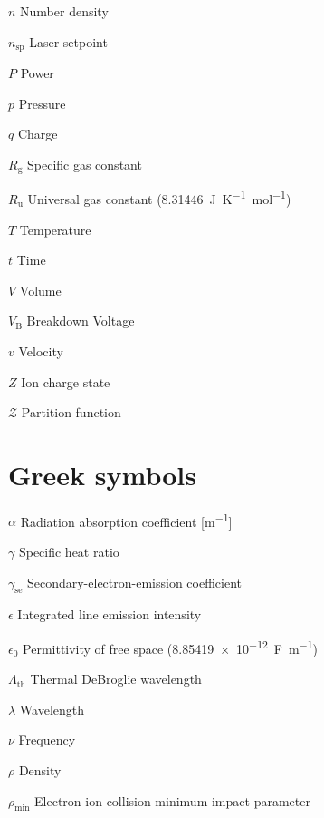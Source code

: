 \begin{multicols}{2}
\begin{nomlist}
        \item[$n$]              Number density 
        \item[$n_\mathrm{sp}$]  Laser setpoint 
        \item[$P$]              Power 
        \item[$p$]              Pressure
        \item[$q$]              Charge
        \item[$R_\mathrm{g}$]   Specific gas constant
        \item[$R_\mathrm{u}$]   Universal gas constant (\qty{8.31446}{J.K^{-1}.mol^{-1}})
        \item[$T$]              Temperature
        \item[$t$]              Time
        \item[$V$]              Volume
        \item[$V_\mathrm{B}$]   Breakdown Voltage
        \item[$v$]              Velocity
        \item[$Z$]              Ion charge state
        \item[$\mathcal{Z}$]    Partition function
    \end{nomlist}

    \section*{Greek symbols}
    \begin{nomlist}
        \item[$\alpha$]         Radiation absorption coefficient [\unit{m^{-1}}]
        \item[$\gamma$]         Specific heat ratio
        \item[$\gamma_\mathrm{se}$]         Secondary-electron-emission coefficient
        \item[$\epsilon$]       Integrated line emission intensity 
        \item[$\epsilon_0$]     Permittivity of free space (\qty{8.85419e-12}{F.m^{-1}})
        \item[$\Lambda_\mathrm{th}$]        Thermal DeBroglie wavelength
        \item[$\lambda$]        Wavelength
        \item[$\nu$]            Frequency
        \item[$\rho$]           Density
        \item[$\rho_\mathrm{min}$]  Electron-ion collision minimum impact parameter
    \end{nomlist}


\end{multicols}
